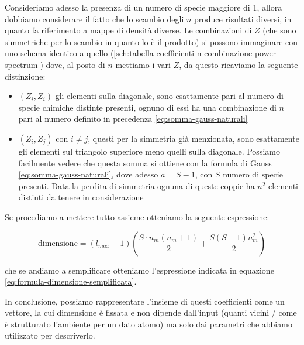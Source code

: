 Consideriamo adesso la presenza di un numero di specie maggiore di 1, allora dobbiamo considerare il fatto che lo scambio degli $n$ produce risultati diversi, in quanto fa riferimento a mappe di densità diverse. Le combinazioni di $Z$ (che sono simmetriche per lo scambio in quanto lo è il prodotto) si possono immaginare con uno schema identico a quello (\ref{sch:tabella-coefficienti-n-combinazione-power-spectrum}) dove, al posto di $n$ mettiamo i vari $Z$, da questo ricaviamo la seguente distinzione:

\begin{itemize}
    \item[-] $(Z_i,Z_i)$ gli elementi sulla diagonale, sono esattamente pari al numero di specie chimiche distinte presenti, ognuno di essi ha una combinazione di $n$ pari al numero definito in precedenza \eqref{eq:somma-gauss-naturali}
    
    \item[-] $(Z_i,Z_j)$ con $i \neq j$, questi per la simmetria già menzionata, sono esattamente gli elementi sul triangolo superiore meno quelli sulla diagonale. Possiamo facilmente vedere che questa somma si ottiene con la formula di Gauss \eqref{eq:somma-gauss-naturali}, dove adesso $a = S - 1$, con $S$ numero di specie presenti. Data la perdita di simmetria ognuna di queste coppie ha $n^2$ elementi distinti da tenere in considerazione
\end{itemize}

Se procediamo a mettere tutto assieme otteniamo la seguente espressione:

\begin{equation}
    \mathrm{dimensione} = (l_{max} + 1) \left( \frac{S\cdot n_{m}(n_m + 1)}{2} + \frac{S(S-1)n_m^2}{2} \right)
\end{equation}

che se andiamo a semplificare otteniamo l'espressione indicata in equazione \eqref{eq:formula-dimensione-semplificata}.

In conclusione, possiamo rappresentare l'insieme di questi coefficienti come un vettore, la cui dimensione è fissata e non dipende dall'input (quanti vicini / come è strutturato l'ambiente per un dato atomo) ma solo dai parametri che abbiamo utilizzato per descriverlo.


